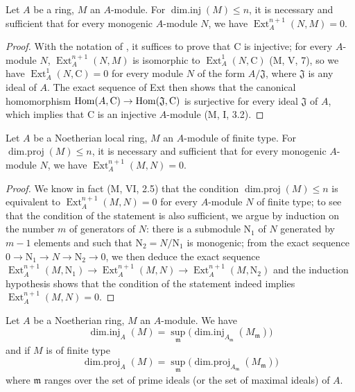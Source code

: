 \begin{lemma}[17.2.3]
\label{0.17.2.3}
Let $A$ be a ring, $M$ an $A$-module.
For $\operatorname{dim.inj}(M)\leq n$, it is necessary and sufficient that for every monogenic $A$-module $N$, we have $\operatorname{Ext}^{n+1}_A(N,M)=0$.
\end{lemma}

\begin{proof}
With the notation of , it suffices to prove that $\mathrm{C}$ is injective;
for every $A$-module $N$, $\operatorname{Ext}^{n+1}_A(N,M)$ is isomorphic to $\operatorname{Ext}^1_A(N,\mathrm{C})$ (M, V, 7), so we have $\operatorname{Ext}^1_A(N,\mathrm{C})=0$ for every module $N$ of the form $A/\mathfrak{J}$, where $\mathfrak{J}$ is any ideal of $A$.
The exact sequence of Ext then shows that the canonical homomorphism $\operatorname{Hom}(A,\mathrm{C})\to\operatorname{Hom}(\mathfrak{J},\mathrm{C})$ is surjective for every ideal $\mathfrak{J}$ of $A$, which implies that $\mathrm{C}$ is an injective $A$-module (M, I, 3.2).
\end{proof}

\begin{lemma}[17.2.4]
\label{0.17.2.4}
Let $A$ be a Noetherian local ring, $M$ an $A$-module of finite type.
For $\operatorname{dim.proj}(M)\leq n$, it is necessary and sufficient that for every monogenic $A$-module $N$, we have $\operatorname{Ext}^{n+1}_A(M,N)=0$.
\end{lemma}

\begin{proof}
We know in fact (M, VI, 2.5) that the condition $\operatorname{dim.proj}(M)\leq n$ is equivalent to $\operatorname{Ext}^{n+1}_A(M,N)=0$ for every $A$-module $N$ of finite type;
to see that the condition of the statement is also sufficient, we argue by induction on the number $m$ of generators of $N$:
there is a submodule $\mathrm{N}_1$ of $N$ generated by $m-1$ elements and such that $\mathrm{N}_2=N/\mathrm{N}_1$ is monogenic;
from the exact sequence $0\to\mathrm{N}_1\to N\to\mathrm{N}_2\to 0$, we then deduce the exact sequence $\operatorname{Ext}^{n+1}_A(M,\mathrm{N}_1)\to\operatorname{Ext}^{n+1}_A(M,N)\to\operatorname{Ext}^{n+1}_A(M,\mathrm{N}_2)$ and the induction hypothesis shows that the condition of the statement indeed implies $\operatorname{Ext}^{n+1}_A(M,N)=0$.
\end{proof}

\begin{corollary}[17.2.5]
\label{0.17.2.5}
Let $A$ be a Noetherian ring, $M$ an $A$-module.
We have
\[
\label{0.17.2.5.1}
  \operatorname{dim.inj}_A(M)=\sup_\mathfrak{m}\big(\operatorname{dim.inj}_{A_\mathfrak{m}}(M_\mathfrak{m})\big)
  \tag{17.2.5.1}
\]
and if $M$ is of finite type
\[
\label{0.17.2.5.2}
  \operatorname{dim.proj}_A(M)=\sup_\mathfrak{m}\big(\operatorname{dim.proj}_{A_\mathfrak{m}}(M_\mathfrak{m})\big)
  \tag{17.2.5.2}
\]
where $\mathfrak{m}$ ranges over the set of prime ideals (or the set of maximal ideals) of $A$.
\end{corollary}

